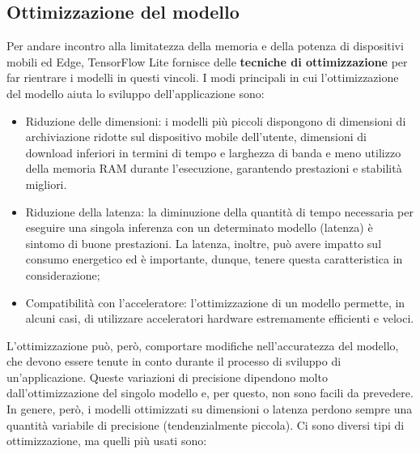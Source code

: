 \subsection{Ottimizzazione del modello}
Per andare incontro alla limitatezza della memoria e della potenza di dispositivi mobili ed Edge, TensorFlow Lite fornisce delle \textbf{tecniche
di ottimizzazione} per far rientrare i modelli in questi vincoli.
I modi principali in cui l’ottimizzazione del modello aiuta lo sviluppo dell’applicazione sono:
\begin{itemize}
    \item Riduzione delle dimensioni: i modelli più piccoli dispongono di dimensioni di archiviazione ridotte sul dispositivo mobile dell’utente,
    dimensioni di download inferiori in termini di tempo e larghezza di banda e meno utilizzo della memoria RAM durante l’esecuzione, garantendo
    prestazioni e stabilità migliori.
    \item Riduzione della latenza: la diminuzione della quantità di tempo necessaria per eseguire una singola inferenza con un determinato modello
    (latenza) è sintomo di buone prestazioni. La latenza, inoltre, può avere impatto sul consumo energetico ed è importante, dunque, tenere questa
    caratteristica in considerazione;
    \item Compatibilità con l’acceleratore: l’ottimizzazione di un modello permette, in alcuni casi, di utilizzare acceleratori hardware estremamente
    efficienti e veloci.
\end{itemize}
L’ottimizzazione può, però, comportare modifiche nell’accuratezza del modello, che devono essere tenute in conto durante il processo di sviluppo di
un’applicazione. Queste variazioni di precisione dipendono molto dall’ottimizzazione del singolo modello e, per questo, non sono facili da prevedere.
In genere, però, i modelli ottimizzati su dimensioni o latenza perdono sempre una quantità variabile di precisione (tendenzialmente piccola). 
Ci sono diversi tipi di ottimizzazione, ma quelli più usati sono:
